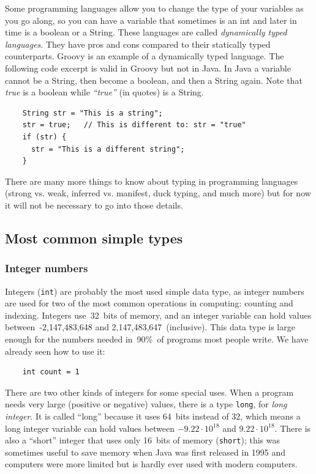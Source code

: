 Some programming languages allow you to change the type of your
variables as you go along, so you can have a variable that sometimes
is an int and later in time is a boolean or a String. These languages
are called \emph{dynamically typed languages}. They have pros and cons
compared to their statically typed counterparts. Groovy is an example
of a dynamically typed language. The following code excerpt is valid
in Groovy but not in Java. In Java a variable cannot be a String,
then become a boolean, and then a String again. 
Note that \emph{true} is a
boolean while \emph{``true''} (in quotes) is a String. 

\begin{verbatim}
    String str = "This is a string";
    str = true;   // This is different to: str = "true"
    if (str) {
      str = "This is a different string";
    }
\end{verbatim}

There are many more things to know about typing in programming
languages (strong vs. weak, inferred vs. manifest, duck typing, and
much more) but for now it will not be necessary to go into those
details. 

\subsection{Most common simple types}
\label{sec:most-common-simple}

\subsubsection{Integer numbers}
\label{sec:integers}

Integers (\verb+int+) are probably the most used simple data type, as
integer numbers are used for two of the most common operations in
computing: counting and indexing. Integers use~32~bits of memory, and
an integer variable can hold values between~-2,147,483,648 and
2,147,483,647~(inclusive). This data type is large enough for the
numbers needed in~90\%~of programs most people write. We have already
seen how to use it: 

\begin{verbatim}
    int count = 1
\end{verbatim}

There are two other kinds of integers for some special uses. When a
program needs very large (positive or negative) values, there is a
type \verb+long+, for \emph{long integer}. It is called ``long''
because it uses 64~bits instead of 32, which means a long integer
variable can hold values between \mbox{$-9.22 \cdot 10^{18}$} and
\mbox{$9.22 \cdot 10^{18}$}. There is also a ``short''
integer that uses only 16~bits of memory (\verb+short+); this was
sometimes useful to save memory when Java was first released in 1995
and computers were more limited but is hardly ever used with modern
computers.

